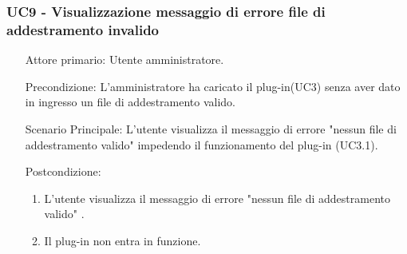 \subsubsection{UC9 - Visualizzazione messaggio di errore file di addestramento invalido}
\label{sssec:uc9}
\begin{description}
	\begin{enumerate}
		\item[Attore primario:] Utente amministratore.
		\item[Precondizione:] L'amministratore ha caricato il plug-in(UC3) senza aver dato in ingresso un file di addestramento valido.
		\item[Scenario Principale:] L'utente visualizza il messaggio di errore "nessun file di addestramento valido" impedendo il funzionamento del plug-in (UC3.1).
		\item[Postcondizione:]
		\begin{enumerate}
			\item L'utente visualizza il messaggio di errore "nessun file di addestramento valido" .
			\item Il plug-in non entra in funzione.
		\end{enumerate}
	\end{enumerate}
\end{description}
